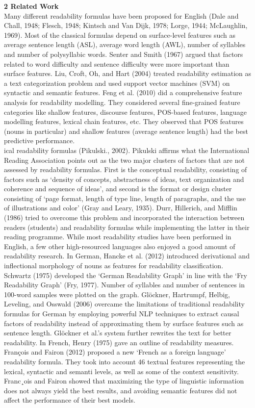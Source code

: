 \documentclass[9pt]{article}
\begin{document}
\huge{\textbf{2 Related Work}}\\
Many diﬀerent readability formulas have been proposed for English (Dale and Chall, 1948; Flesch, 1948; Kintsch and Van Dijk, 1978; Lorge, 1944; McLaughlin, 1969). Most of the classical formulas depend on surface-level features such as average sentence length (ASL), average word length (AWL), number of syllables and number of polysyllabic words. Senter and Smith (1967) argued that factors related to word diﬃculty and sentence diﬃculty were more important than surface features. Liu, Croft, Oh, and Hart (2004) treated readability estimation as a text categorization problem and used support vector machines (SVM) on syntactic and semantic features. Feng et al. (2010) did a comprehensive feature analysis for readability modelling. They considered several ﬁne-grained feature categories like shallow features, discourse features, POS-based features, language modelling features, lexical chain features, etc. They observed that POS features (nouns in particular) and shallow features (average sentence length) had the best predictive performance.\\
ical readability formulas (Pikulski., 2002). Pikulski aﬃrms what the International Reading Association points out as the two major clusters of factors that are not assessed by readability formulas. First is the conceptual readability, consisting of factors such as ‘density of concepts, abstractness of ideas, text organization and coherence and sequence of ideas’, and second is the format or design cluster consisting of ‘page format, length of type line, length of paragraphs, and the use of illustrations and color’ (Gray and Leary, 1935). Durr, Hillerich, and Miﬄin (1986) tried to overcome this problem and incorporated the interaction between readers (students) and readability formulas while implementing the latter in their reading programme. While most readability studies have been performed in English, a few other high-resourced languages also enjoyed a good amount of readability research. In German, Hancke et al. (2012) introduced derivational and inﬂectional morphology of nouns as features for readability classiﬁcation. Schwartz (1975) developed the ‘German Readability Graph’ in line with the ‘Fry Readability Graph’ (Fry, 1977). Number of syllables and number of sentences in 100-word samples were plotted on the graph. Glöckner, Hartrumpf, Helbig, Leveling, and Osswald (2006) overcame the limitations of traditional readability formulas for German by employing powerful NLP techniques to extract causal factors of readability instead of approximating them by surface features such as sentence length. Glöckner et al.’s system further rewrites the text for better readability. In French, Henry (1975) gave an outline of readability measures. François and Fairon (2012) proposed a new ‘French as a foreign language’ readability formula. They took into account 46 textual features representing the lexical, syntactic and semanti levels, as well as some of the context sensitivity. Franc¸ois and Fairon showed that maximizing the type of linguistic information does not always yield the best results, and avoiding semantic features did not aﬀect the performance of their best models.\\
\end{document}
